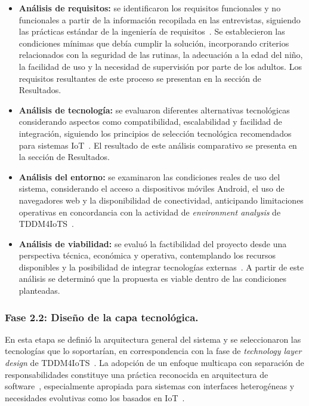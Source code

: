 					\begin{itemize}
						\item \textbf{Análisis de requisitos:} se identificaron los requisitos funcionales y no funcionales a partir de la información recopilada en las entrevistas, siguiendo las prácticas estándar de la ingeniería de requisitos~\cite{Fowler2002}. Se establecieron las condiciones mínimas que debía cumplir la solución, incorporando criterios relacionados con la seguridad de las rutinas, la adecuación a la edad del niño, la facilidad de uso y la necesidad de supervisión por parte de los adultos. Los requisitos resultantes de este proceso se presentan en la sección de Resultados.
						\item \textbf{Análisis de tecnología:} se evaluaron diferentes alternativas tecnológicas considerando aspectos como compatibilidad, escalabilidad y facilidad de integración, siguiendo los principios de selección tecnológica recomendados para sistemas IoT~\cite{GuerreroUlloa2024,Kleppmann2017}. El resultado de este análisis comparativo se presenta en la sección de Resultados.
						\item \textbf{Análisis del entorno:} se examinaron las condiciones reales de uso del sistema, considerando el acceso a dispositivos móviles Android, el uso de navegadores web y la disponibilidad de conectividad, anticipando limitaciones operativas en concordancia con la actividad de \textit{environment analysis} de TDDM4IoTS~\cite{GuerreroUlloa2024}.
						\item \textbf{Análisis de viabilidad:} se evaluó la factibilidad del proyecto desde una perspectiva técnica, económica y operativa, contemplando los recursos disponibles y la posibilidad de integrar tecnologías externas~\cite{Creswell2018}. A partir de este análisis se determinó que la propuesta es viable dentro de las condiciones planteadas.
					\end{itemize}
					
				\subsubsection{Fase 2.2: Diseño de la capa tecnológica.}
					En esta etapa se definió la arquitectura general del sistema y se seleccionaron las tecnologías que lo soportarían, en correspondencia con la fase de \textit{technology layer design} de TDDM4IoTS~\cite{GuerreroUlloa2024}. La adopción de un enfoque multicapa con separación de responsabilidades constituye una práctica reconocida en arquitectura de software~\cite{Fowler2002}, especialmente apropiada para sistemas con interfaces heterogéneas y necesidades evolutivas como los basados en IoT~\cite{Kleppmann2017}.
					
